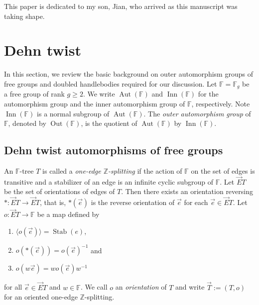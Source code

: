\documentclass[12pt,a4paper]{amsart}
\numberwithin{equation}{section}
\DeclareMathOperator{\Out}{Out}
\DeclareMathOperator{\Aut}{Aut}
\DeclareMathOperator{\Inn}{Inn}
\newcommand{\FF}{\mathbb{F}}
\theoremstyle{plain}
\theoremstyle{definition}
\theoremstyle{remark}
\begin{document}
This paper is dedicated to my son, Jian, who arrived as this manuscript was taking shape.









\section{Dehn twist}





In this section, we review the basic background on outer automorphism groups of free groups and doubled handlebodies required for our discussion.
Let $\FF = \FF_g$ be a free group of rank $g \geq 2$.
We write $\Aut(\FF)$ and $\Inn(\FF)$ for the automorphism group and the inner automorphism group of $\FF$, respectively.
Note $\Inn(\FF)$ is a normal subgroup of $\Aut(\FF)$.
The \emph{outer automorphism group} of $\FF$, denoted by $\Out(\FF)$, is the quotient of $\Aut(\FF)$ by $\Inn(\FF)$.





\subsection{Dehn twist automorphisms of free groups}





An $\FF$-tree $T$ is called a \emph{one-edge $\mathbb{Z}$-splitting} if the action of $\FF$ on the set of edges is transitive and a stabilizer of an edge is an infinite cyclic subgroup of $\FF$.
Let $\vec{E}T$ be the set of orientations of edges of $T$.
Then there exists an orientation reversing $*: \vec{E}T \to \vec{E}T$, that is, $*(\vec{e})$ is the reverse orientation of $\vec{e}$ for each $\vec{e} \in \vec{E}T$.
Let $o: \vec{E}T \to \FF$ be a map defined by
\begin{enumerate}
    \item $\langle o(\vec{e}) \rangle = \operatorname{Stab}(e)$,
    \item $o(*(\vec{e}))= o(\vec{e})^{-1}$ and
    \item $o(w\vec{e}) = wo(\vec{e})w^{-1}$
\end{enumerate}
for all $\vec{e} \in \vec{E}T$ and $w \in \FF$.
We call $o$ an \emph{orientation} of $T$ and write $\vec{T} := (T, o)$ for an oriented one-edge $\mathbb{Z}$-splitting.
\end{document}
